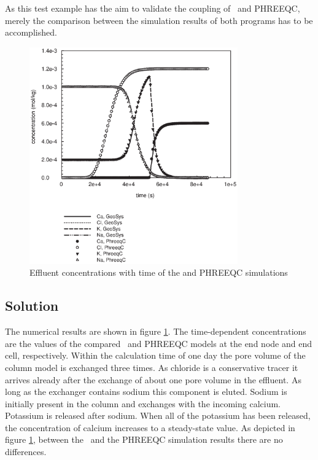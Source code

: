 As this test example has the aim to validate the coupling of \GeoSys~and PHREEQC, merely the comparison between the simulation results of both programs has to be accomplished.

\begin{figure}[htbp]
\centering
\includegraphics[width=0.8\textwidth]{PART_III/HC/cation_exchange.eps}
\caption{Effluent concentrations  with time of the \GeoSys and PHREEQC simulations}
\label{fig:cationex_output}
\end{figure}

\subsection{Solution}

The numerical results are shown in figure \ref{fig:cationex_output}. The time-dependent concentrations are the values of the compared \GeoSys~and PHREEQC models at the end node and end cell, respectively. Within the calculation time of one day the pore volume of the column model is exchanged three times. As chloride is a conservative tracer it arrives already after the exchange of about one pore volume in the effluent. As long as the exchanger contains sodium this component is eluted. Sodium is initially present in the column and exchanges with the incoming calcium. Potassium is released after sodium. When all of the potassium has been released, the concentration of calcium increases to a steady-state value. As depicted in figure \ref{fig:cationex_output}, between the \GeoSys~and the PHREEQC simulation results there are no differences.

